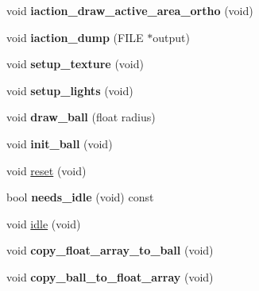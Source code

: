 \begin{DoxyCompactItemize}
\item 
\hypertarget{class_g_l_u_i___rotation_aea8411d09fec628a8af788b0998746f2}{void {\bfseries iaction\+\_\+draw\+\_\+active\+\_\+area\+\_\+ortho} (void)}\label{class_g_l_u_i___rotation_aea8411d09fec628a8af788b0998746f2}

\item 
\hypertarget{class_g_l_u_i___rotation_a6792c8f6fd8d2e52dd1e7729f7679fba}{void {\bfseries iaction\+\_\+dump} (F\+I\+L\+E $\ast$output)}\label{class_g_l_u_i___rotation_a6792c8f6fd8d2e52dd1e7729f7679fba}

\item 
\hypertarget{class_g_l_u_i___rotation_ad8f18b5b96e4269533bd41cf1ee2d490}{void {\bfseries setup\+\_\+texture} (void)}\label{class_g_l_u_i___rotation_ad8f18b5b96e4269533bd41cf1ee2d490}

\item 
\hypertarget{class_g_l_u_i___rotation_a434da267e0f38a2e33c28d6d2b0742a1}{void {\bfseries setup\+\_\+lights} (void)}\label{class_g_l_u_i___rotation_a434da267e0f38a2e33c28d6d2b0742a1}

\item 
\hypertarget{class_g_l_u_i___rotation_a9e90fec3ccc22bcc89afd256d5842d8d}{void {\bfseries draw\+\_\+ball} (float radius)}\label{class_g_l_u_i___rotation_a9e90fec3ccc22bcc89afd256d5842d8d}

\item 
\hypertarget{class_g_l_u_i___rotation_a3208f44f601e410ac01745903a5bca76}{void {\bfseries init\+\_\+ball} (void)}\label{class_g_l_u_i___rotation_a3208f44f601e410ac01745903a5bca76}

\item 
void \hyperlink{class_g_l_u_i___rotation_ab6ce638fa62a697b3eb177a7ac879919}{reset} (void)
\item 
\hypertarget{class_g_l_u_i___rotation_aa11e56ce208283dfcbbe67728b3de673}{bool {\bfseries needs\+\_\+idle} (void) const }\label{class_g_l_u_i___rotation_aa11e56ce208283dfcbbe67728b3de673}

\item 
void \hyperlink{class_g_l_u_i___rotation_a809f09063d91dcb89ea237849d5478ac}{idle} (void)
\item 
\hypertarget{class_g_l_u_i___rotation_aea0344d014f9edafcef3f539767c5014}{void {\bfseries copy\+\_\+float\+\_\+array\+\_\+to\+\_\+ball} (void)}\label{class_g_l_u_i___rotation_aea0344d014f9edafcef3f539767c5014}

\item 
\hypertarget{class_g_l_u_i___rotation_a900d3fa4234a3af2e9a39686af64f37d}{void {\bfseries copy\+\_\+ball\+\_\+to\+\_\+float\+\_\+array} (void)}\label{class_g_l_u_i___rotation_a900d3fa4234a3af2e9a39686af64f37d}


\end{DoxyCompactItemize}
